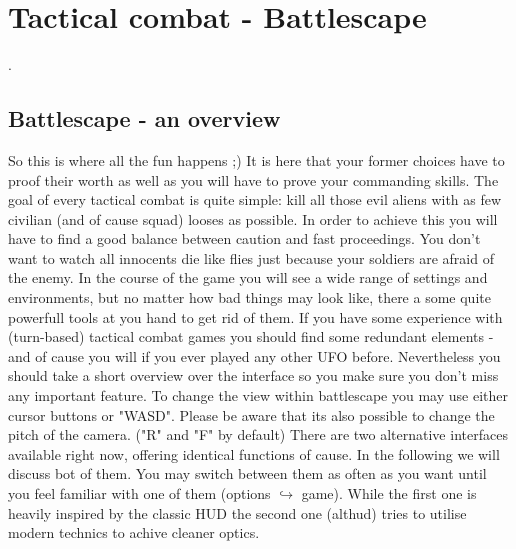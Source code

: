 
%
%


\chapter{Tactical combat - Battlescape}

.

\section{Battlescape - an overview}
So this is where all the fun happens ;) It is here that your former choices have to proof their worth as well as you will have to prove your commanding skills.
The goal of every tactical combat is quite simple: kill all those evil aliens with as few civilian (and of cause squad) looses as possible. In order to achieve this you will have to find a good balance between caution and fast proceedings. You don't want to watch all innocents die like flies just because your soldiers are afraid of the enemy.
In the course of the game you will see a wide range of settings and environments, but no matter how bad things may look like, there a some quite powerfull tools at you hand to get rid of them. If you have some experience with (turn-based) tactical combat games you should find some redundant elements - and of cause you will if you ever played any other UFO before. Nevertheless you should take a short overview over the interface so you make sure you don't miss any important feature. To change the view within battlescape you may use either cursor buttons or "WASD". Please be aware that its also possible to change the pitch of the camera. ("R" and "F" by default)
There are two alternative interfaces available right now, offering identical functions of cause. In the following we will discuss bot of them. You may switch between them as often as you want until you feel familiar with one of them (options $\hookrightarrow$ game).
While the first one is heavily inspired by the classic HUD the second one (althud) tries to utilise modern technics to achive cleaner optics.
